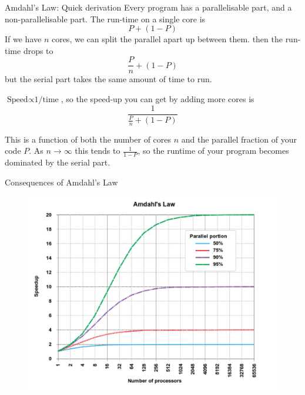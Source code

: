 \documentclass{beamer}
\begin{document}
\begin{frame}{Amdahl's Law: Quick derivation}
	Every program has a parallelisable part, and a non-parallelisable part.
	The run-time on a single core is
	$$
	P + (1 - P)
	$$
	If we have $n$ cores, we can split the parallel apart up between them. then
	the run-time drops to
	$$
	\frac{P}{n} + (1-P)
	$$
	but the serial part takes the same amount of time to run.
	
	$\text{Speed} \propto \text{1/time}$, so the speed-up you can get by adding
	more cores is
	$$
	\frac{1}{\frac{P}{n} + (1-P)}
	$$

	This is a function of both the number of cores $n$ and the parallel fraction
	of your code $P$. As $n \to \infty$ this tends to $\frac{1}{1-P}$, so the
	runtime of your program becomes dominated by the serial part.
\end{frame}

\begin{frame}{Consequences of Amdahl's Law}
	\begin{figure}
		\includegraphics[scale=0.45]{AmdahlsLaw.pdf}	
	\end{figure}
\end{frame}
\end{document}
